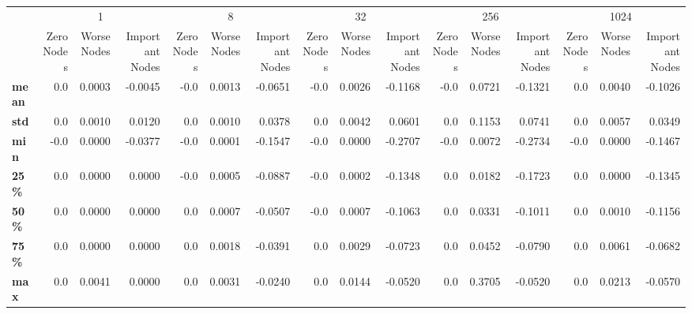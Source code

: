 \begin{tabular}{lrrrrrrrrrrrrrrr}
\toprule
{} & \multicolumn{3}{c}{1} & \multicolumn{3}{c}{8} & \multicolumn{3}{c}{32} & \multicolumn{3}{c}{256} & \multicolumn{3}{c}{1024} \\
{} & Zero Nodes & Worse Nodes & Important Nodes & Zero Nodes & Worse Nodes & Important Nodes & Zero Nodes & Worse Nodes & Important Nodes & Zero Nodes & Worse Nodes & Important Nodes & Zero Nodes & Worse Nodes & Important Nodes \\
\midrule
\textbf{mean} &        0.0 &      0.0003 &         -0.0045 &       -0.0 &      0.0013 &         -0.0651 &       -0.0 &      0.0026 &         -0.1168 &       -0.0 &      0.0721 &         -0.1321 &        0.0 &      0.0040 &         -0.1026 \\
\textbf{std } &        0.0 &      0.0010 &          0.0120 &        0.0 &      0.0010 &          0.0378 &        0.0 &      0.0042 &          0.0601 &        0.0 &      0.1153 &          0.0741 &        0.0 &      0.0057 &          0.0349 \\
\textbf{min } &       -0.0 &      0.0000 &         -0.0377 &       -0.0 &      0.0001 &         -0.1547 &       -0.0 &      0.0000 &         -0.2707 &       -0.0 &      0.0072 &         -0.2734 &       -0.0 &      0.0000 &         -0.1467 \\
\textbf{25\% } &        0.0 &      0.0000 &          0.0000 &       -0.0 &      0.0005 &         -0.0887 &       -0.0 &      0.0002 &         -0.1348 &        0.0 &      0.0182 &         -0.1723 &        0.0 &      0.0000 &         -0.1345 \\
\textbf{50\% } &        0.0 &      0.0000 &          0.0000 &        0.0 &      0.0007 &         -0.0507 &       -0.0 &      0.0007 &         -0.1063 &        0.0 &      0.0331 &         -0.1011 &        0.0 &      0.0010 &         -0.1156 \\
\textbf{75\% } &        0.0 &      0.0000 &          0.0000 &        0.0 &      0.0018 &         -0.0391 &        0.0 &      0.0029 &         -0.0723 &        0.0 &      0.0452 &         -0.0790 &        0.0 &      0.0061 &         -0.0682 \\
\textbf{max } &        0.0 &      0.0041 &          0.0000 &        0.0 &      0.0031 &         -0.0240 &        0.0 &      0.0144 &         -0.0520 &        0.0 &      0.3705 &         -0.0520 &        0.0 &      0.0213 &         -0.0570 \\
\bottomrule
\end{tabular}
